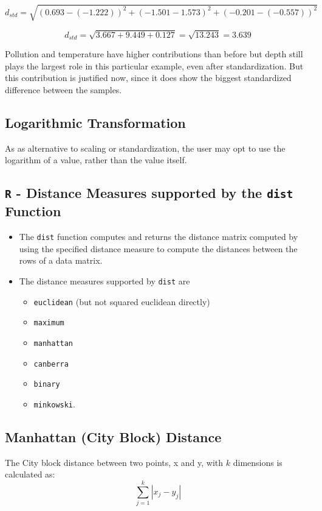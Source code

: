 \documentclass[SKLCluster.tex]{subfiles}
\begin{document}
\[ d_{std} =  \sqrt{(0.693 - (- 1.222))^2 + (-1.501-1.573)^2 + (-0.201-(-0.557))^2} \]

\[ d_{std} = \sqrt{3.667 + 9.449 + 0.127} = \sqrt{13.243} = 3.639 \]

Pollution and temperature have higher contributions than before but depth still plays the
largest role in this particular example, even after standardization. But this contribution is
justified now, since it does show the biggest standardized difference between the samples. 
\subsection{Logarithmic Transformation}
As as alternative to scaling or standardization, the user may opt to use the logarithm of a value, rather than the value itself.
\newpage
\subsection{\texttt{R} - Distance Measures supported by the \texttt{dist} Function}
\begin{itemize}
\item The \texttt{dist} function computes and returns the distance matrix computed by using the specified distance measure to compute the distances between the rows of a data matrix.
\item 
The distance measures supported by \texttt{dist} are

\begin{itemize}
\item \texttt{euclidean} (but not squared euclidean directly)
\item \texttt{maximum}
\item \texttt{manhattan}
\item \texttt{canberra}
\item \texttt{binary} 
\item \texttt{minkowski}.
\end{itemize}
\end{itemize}

\subsection{Manhattan (City Block) Distance}
The City block distance between two points, x and y, with $k$ dimensions is calculated as:
\[ \sum^{k}_{j=1} | x_j - y_j |  \]
\end{document}
